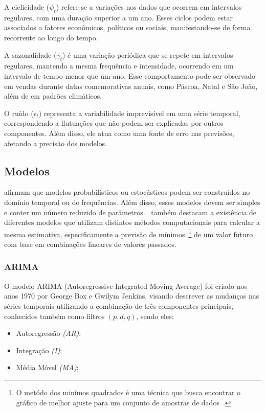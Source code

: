         
        A ciclicidade ($\psi_t$) refere-se a variações nos dados que ocorrem em intervalos regulares, com uma duração superior a um 
        ano. Esses ciclos podem estar associados a fatores econômicos, políticos ou sociais, manifestando-se de forma recorrente ao 
        longo do tempo.     
        
        A sazonalidade ($\gamma_t$) é uma variação periódica que se repete em intervalos regulares, mantendo a mesma frequência e 
        intensidade, ocorrendo em um intervalo de tempo menor que um ano. Esse comportamento pode ser observado em 
        vendas durante datas comemorativas anuais, como Páscoa, Natal e São João, além de em padrões climáticos.
        
        O ruído ($\epsilon_t$) representa a variabilidade imprevisível em uma série temporal, correspondendo a flutuações que não 
        podem ser explicadas por outros componentes. Além disso, ele atua como uma fonte de erro nas previsões, afetando a precisão 
        dos modelos.


    \subsection{Modelos}
         afirmam que modelos probabilísticos ou estocásticos podem ser construídos no 
        domínio temporal ou de frequências. Além disso, esses modelos devem ser simples e conter um número 
        reduzido de parâmetros.~ também destacam a existência de diferentes modelos 
        que utilizam distintos métodos computacionais para calcular a mesma estimativa, especificamente a 
        previsão de mínimos~\footnote{O metódo dos minímos quadrados é uma técnica que busca encontrar o 
        gráfico de melhor ajuste para um conjunto de amostras de dados~\cite{miyasaki2010}.} de um valor 
        futuro com base em combinações lineares de valores passados.

        \subsubsection{ARIMA}
            O modelo ARIMA (Autoregressive Integrated Moving Average) foi criado nos anos 1970 por George Box
            e Gwilym Jenkins, visando descrever as mudanças nas séries temporais utilizando a combinação de três
            componentes principais, conhecidos também como filtros \((p, d, q)\), sendo eles:
            \begin{itemize}
                \item Autoregressão \emph{(AR)};
                \item Integração \emph{(I)};
                \item Média Móvel \emph{(MA)};
            \end{itemize}

